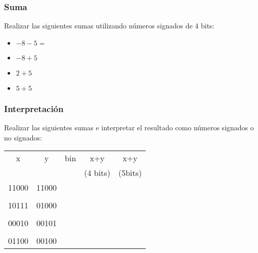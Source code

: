 \subsubsection{Suma}
Realizar las siguientes sumas utilizando números signados de 4 bits:
\begin{itemize}
  \item $ -8-5= $
  \item $-8+5$
  \item $2+5$
  \item $5+5$
\end{itemize}

\subsubsection{Interpretación}
Realizar las siguientes sumas e interpretar el resultado como números signados o no signados:\\

\begin{tabular}{ccccc}
x&y&bin&x+y&x+y\\
&&&(4 bits)&(5bits)\\
11000&11000&\underspace&\underspace&\underspace\\
&&&&\\
10111&01000&\underspace&\underspace&\underspace\\
&&&&\\
00010&00101&\underspace&\underspace&\underspace\\
&&&&\\
01100&00100&\underspace&\underspace&\underspace\\
\end{tabular}

